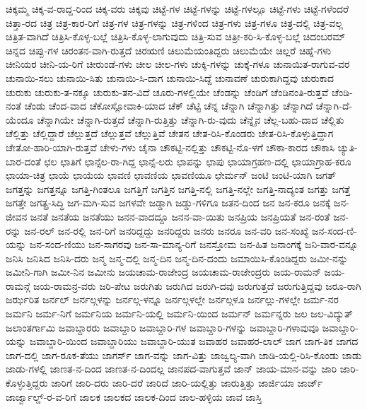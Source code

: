 {ಚಿಕ್ಕಮ್ಮ
ಚಿಕ್ಕ-ವ-ರಾದ್ದ-ರಿಂದ
ಚಿಕ್ಕ-ವರು
ಚಿಕ್ಕವು
ಚಿಟ್ಟೆ-ಗಳ
ಚಿಟ್ಟೆ-ಗಳನ್ನು
ಚಿಟ್ಟೆ-ಗಳಲ್ಲೂ
ಚಿಟ್ಟೆ-ಗಳು
ಚಿಟ್ಟೆ-ಗಳೆಂದರೆ
ಚಿತ್ತಾ-ರದ
ಚಿತ್ರ
ಚಿತ್ರ-ಕಾರ-ರಿಗೆ
ಚಿತ್ರ-ಗಳ
ಚಿತ್ರ-ಗಳನ್ನು
ಚಿತ್ರ-ಗಳಿಂದ
ಚಿತ್ರ-ಗಳು
ಚಿತ್ರ-ಗಳೂ
ಚಿತ್ರ-ದಲ್ಲಿ
ಚಿತ್ರ-ವಲ್ಲ
ಚಿತ್ರಿತ-ವಾಗಿದೆ
ಚಿತ್ರಿಸಿ-ಕೊಳ್ಳ-ಬಲ್ಲೆ
ಚಿತ್ರಿಸಿ-ಕೊಳ್ಳ-ಲಾಗುವುದು
ಚಿತ್ರಿ-ಸುವ
ಚಿತ್ರೀ-ಕರಿ-ಸಿ-ಕೊಳ್ಳ-ಬಲ್ಲೆ
ಚಿದಂಬರಮ್
ಚಿನ್ನದ
ಚಿಪ್ಪು-ಗಳ
ಚಿರಂತನ-ವಾಗಿ-ರುತ್ತದೆ
ಚಿರಋಣಿ
ಚಿಲುಮೆಯಂತಿದ್ದರು
ಚಿಲುಮೆಯೇ
ಚಿಲ್ಲರೆ
ಚಿಹ್ನೆ-ಗಳು
ಚೀನಿಯರ
ಚೀನಿ-ಯ-ರಿಗೆ
ಚೀರುಂಡೆ-ಗಳು
ಚೀಲ
ಚೀಲ-ಗಳು
ಚುಕ್ಕಿ-ಗಳನ್ನು
ಚುಕ್ಕೆ-ಗಳೂ
ಚುನಾಯಿತ-ರಾಗುವ-ವರ
ಚುನಾಯಿ-ಸಲು
ಚುನಾಯಿ-ಸಿತು
ಚುನಾಯಿ-ಸಿ-ದಾಗ
ಚುನಾಯಿ-ಸಿದ್ದೆ
ಚುನಾವಣೆ
ಚುರುಕಾಗಿದ್ದವು
ಚುರುಕಾದ
ಚುರುಕು
ಚುರುಕು-ತ-ನಕ್ಕೂ
ಚುರುಕು-ತನ-ವಿದೆ
ಚೂರು-ಗಳಲ್ಲಿಯೇ
ಚೆಂಡನ್ನು
ಚೆಂಡಿಗೆ
ಚೆಂಡಿನಂತಿ-ರುತ್ತವೆ
ಚೆಂಡಿ-ನಂತೆ
ಚೆಂಡು
ಚೆಂದ-ವಾದ
ಚೆಕೋಸ್ಲೋವಾಕಿ-ಯಾದ
ಚೆಕ್
ಚೆಟ್ಟಿ
ಚೆನ್ನ
ಚೆನ್ನಾಗಿ
ಚೆನ್ನಾಗಿತ್ತು
ಚೆನ್ನಾಗಿದೆ
ಚೆನ್ನಾಗಿ-ದೆ-ಯೆಂದೂ
ಚೆನ್ನಾಗಿಯೇ
ಚೆನ್ನಾಗಿ-ರುತ್ತದೆ
ಚೆನ್ನಾಗಿ-ರುತ್ತಿತ್ತು
ಚೆನ್ನಾಗಿ-ರು-ವುದು
ಚೆನ್ನೈನ
ಚೆಲ್ಲ-ಬಹು-ದಾದ
ಚೆಲ್ಲಿತು
ಚೆಲ್ಲಿತ್ತು
ಚೆಲ್ಲಿದ್ದಾರೆ
ಚೆಲ್ಲುತ್ತದೆ
ಚೆಲ್ಲುತ್ತವೆ
ಚೆಲ್ಲುತ್ತಿವೆ
ಚೇತನ
ಚೇತ-ರಿಸಿ-ಕೊಂಡರು
ಚೇತ-ರಿಸಿ-ಕೊಳ್ಳುತ್ತಿದ್ದಾಗ
ಚೇತೋ-ಹಾರಿ-ಯಾಗಿ-ರುತ್ತವೆ
ಚೇಳು-ಗಳು
ಚೈನಾ
ಚೌಕಟ್ಟಿ-ನಲ್ಲಿತ್ತು
ಚೌಕಟ್ಟಿ-ನೊ-ಳಗೆ
ಚೌಕಾ-ಕಾರದ
ಚೌಕಾಸಿ
ಚ್ಯುತಿ-ಬಾರ-ದಂತೆ
ಛಲ
ಛಾತಿಗೆ
ಛಾನ್ಸೆಲ-ರಾ-ಗಿದ್ದ
ಛಾನ್ಸೆ-ಲರು
ಛಾಪನ್ನು
ಛಾಪು
ಛಾಯಾಗ್ರಹಣ-ದಲ್ಲಿ
ಛಾಯಾಗ್ರಾಹ-ಕರೂ
ಛಾಯಾ-ಚಿತ್ರ
ಛಾಯೆ
ಛಾಯೆಯ
ಛಾವಣಿ
ಛಾವಣಿಯ
ಛಾವಣಿಯೂ
ಛೇರ್ಮನ್
ಜಂಟಿ
ಜಂಟಿ-ಯಾಗಿ
ಜಗತ್
ಜಗತ್ತನ್ನು
ಜಗತ್ತನ್ನೂ
ಜಗತ್ತಿ-ಗಿಂತಲೂ
ಜಗತ್ತಿಗೆ
ಜಗತ್ತಿನ
ಜಗತ್ತಿ-ನಲ್ಲಿ
ಜಗತ್ತಿ-ನಲ್ಲೇ
ಜಗತ್ತಿ-ನಾದ್ಯಂತ
ಜಗತ್ತು
ಜಗತ್ತೆ
ಜಗತ್ತೇ
ಜಗತ್ಪ್ರ-ಸಿದ್ಧಿ
ಜಗ-ಮಗಿ-ಸುವ
ಜಗಳವೇ
ಜಡ್ಡಾಗಿ
ಜಡ್ಡು-ಗಳಿಗೂ
ಜತನ-ದಿಂದ
ಜನ
ಜನ-ಕರೂ
ಜನಕ್ಕೆ
ಜನ-ಜೀವನ
ಜನತೆ
ಜನತೆಯ
ಜನತೆಯು
ಜನನ-ವಾದದ್ದೂ
ಜನನ-ವಾ-ಯಿತು
ಜನಪ್ರಿಯ
ಜನಪ್ರಿಯತೆ
ಜನ-ರಂತೆ
ಜನ-ರನ್ನು
ಜನ-ರಲ್
ಜನ-ರಲ್ಲಿ
ಜನ-ರಿಗೆ
ಜನರಿದ್ದದ್ದು
ಜನರಿದ್ದರು
ಜನರು
ಜನರೂ
ಜನ-ವರಿ
ಜನ-ಸಂಖ್ಯೆ
ಜನ-ಸಂದ-ಣಿ-ಯನ್ನು
ಜನ-ಸಂದ-ಣಿಯು
ಜನ-ಸಾಗರವು
ಜನ-ಸಾ-ಮಾನ್ಯ-ರಿಗೆ
ಜನಸ್ತೋಮ
ಜನ-ಹಿತ
ಜನಾಂಗಕ್ಕೆ
ಜನಿ-ವಾರ-ವನ್ನೂ
ಜನಿಸಿ
ಜನಿಸಿದ
ಜನಿಸಿ-ದರು
ಜನ್ಮ
ಜನ್ಮ-ದಲ್ಲಿ
ಜನ್ಮ-ದಿನ
ಜನ್ಮ-ದಿನ-ದಂದು
ಜಮಾಯಿಸಿ-ಕೊಂಡಿದ್ದರು
ಜಮೀ-ನನ್ನು
ಜಮೀನಿ-ಗಾಗಿ
ಜಮೀ-ನಿನ
ಜಮೀನು
ಜಯಚಾಮ-ರಾಜೇಂದ್ರ
ಜಯಚಾಮ-ರಾಜೇಂದ್ರರು
ಜಯ-ರಾಮನ್
ಜಯ-ರಾಮನ್ಗೆ
ಜಯ-ರಾಮನ್ರ-ವರು
ಜರಿ-ಪೇಟ
ಜರುಗಿತು
ಜರುಗಿದ
ಜರುಗಿ-ದವು
ಜರುಗುತ್ತದೆ
ಜರುಗುತ್ತಿದ್ದವು
ಜರೂ-ರಾಗಿ
ಜರ್ಝರಿತ
ಜರ್ನಲ್
ಜರ್ನಲ್ಗಳನ್ನು
ಜರ್ನಲ್ಗ-ಳನ್ನೂ
ಜರ್ನಲ್ಗಳಲ್ಲೇ
ಜರ್ನಲ್ಗಳೂ
ಜರ್ನಲ್ಲು-ಗಳಲ್ಲೇ
ಜರ್ಮ-ನರ
ಜರ್ಮನಿ
ಜರ್ಮ-ನಿಗೆ
ಜರ್ಮನಿಯ
ಜರ್ಮನಿ-ಯಲ್ಲಿ
ಜರ್ಮನಿ-ಯಿಂದ
ಜರ್ಮನ್
ಜರ್ಮನ್ನರು
ಜಲ
ಜಲ-ವಿದ್ಯುತ್
ಜಲಾಂತರ್ಗಾಮಿ
ಜವಾಬ್ದಾರರು
ಜವಾಬ್ದಾರಿ
ಜವಾಬ್ದಾರಿ-ಗಳ
ಜವಾಬ್ದಾರಿ-ಗಳನ್ನು
ಜವಾಬ್ದಾರಿ-ಗಳಾವುವೂ
ಜವಾಬ್ದಾರಿ-ಯನ್ನು
ಜವಾಬ್ದಾರಿ-ಯಿಂದ
ಜವಾಬ್ದಾರಿಯು
ಜವಾಬ್ದಾರಿ-ಯುತ
ಜವಾಹರ
ಜವಾಹರ-ಲಾಲ್
ಜಾಗ
ಜಾಗ-ತಿಕ
ಜಾಗದ
ಜಾಗ-ದಲ್ಲಿ
ಜಾಗ-ರೂಕ-ತೆಯು
ಜಾಗರ್ಸ್
ಜಾಗ-ವನ್ನು
ಜಾಗ-ವಿತ್ತು
ಜಾಜ್ವಲ್ಯ-ವಾಗಿ
ಜಾಡಿ-ಯಲ್ಲಿ-ರಿಸಿ-ಕೊಂಡು
ಜಾಡು
ಜಾಡು-ಗಳಲ್ಲಿ
ಜಾಣತ-ನ-ದಿಂದ
ಜಾಣತ-ನ-ದಿಂದಲ್ಲ
ಜಾನಪದ-ವಾಗುತ್ತವೆ
ಜಾನ್
ಜಾಯ-ಮಾನ-ವನ್ನು
ಜಾರಿ
ಜಾರಿ-ಕೊಳ್ಳುತ್ತಿದ್ದರು
ಜಾರಿಗೆ
ಜಾರಿ-ದರು
ಜಾರಿ-ದರೆ
ಜಾರಿದೆ
ಜಾರಿ-ಯಲ್ಲಿತ್ತು
ಜಾರುತ್ತಿತ್ತು
ಜಾರ್ಜಿಯಾ
ಜಾರ್ಜ್
ಜಾರ್ಜ್ವಾಲ್ಡ್-ರ-ವ-ರಿಗೆ
ಜಾಲಕ
ಜಾಲಕದ
ಜಾಲಕ-ದಿಂದ
ಜಾಲ-ಹಳ್ಳಿಯ
ಜಾವ
ಜಾಸ್ತಿ
}
